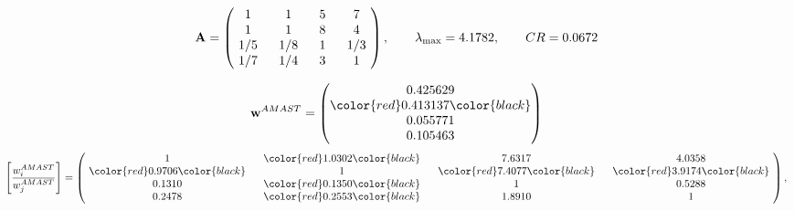 \begin{example}
\begin{equation*}
\mathbf{A} =
\begin{pmatrix}
$\,\,$ 1 $\,\,$ & $\,\,$1$\,\,$ & $\,\,$5$\,\,$ & $\,\,$7 $\,\,$ \\
$\,\,$ 1 $\,\,$ & $\,\,$ 1 $\,\,$ & $\,\,$8$\,\,$ & $\,\,$4 $\,\,$ \\
$\,\,$ 1/5$\,\,$ & $\,\,$ 1/8$\,\,$ & $\,\,$ 1 $\,\,$ & $\,\,$ 1/3 $\,\,$ \\
$\,\,$ 1/7$\,\,$ & $\,\,$ 1/4$\,\,$ & $\,\,$3$\,\,$ & $\,\,$ 1  $\,\,$ \\
\end{pmatrix},
\qquad
\lambda_{\max} =
4.1782,
\qquad
CR = 0.0672
\end{equation*}

\begin{equation*}
\mathbf{w}^{AMAST} =
\begin{pmatrix}
0.425629\\
\color{red} 0.413137\color{black} \\
0.055771\\
0.105463
\end{pmatrix}\end{equation*}
\begin{equation*}
\left[ \frac{{w}^{AMAST}_i}{{w}^{AMAST}_j} \right] =
\begin{pmatrix}
$\,\,$ 1 $\,\,$ & $\,\,$\color{red} 1.0302\color{black} $\,\,$ & $\,\,$7.6317$\,\,$ & $\,\,$4.0358$\,\,$ \\
$\,\,$\color{red} 0.9706\color{black} $\,\,$ & $\,\,$ 1 $\,\,$ & $\,\,$\color{red} 7.4077\color{black} $\,\,$ & $\,\,$\color{red} 3.9174\color{black}   $\,\,$ \\
$\,\,$0.1310$\,\,$ & $\,\,$\color{red} 0.1350\color{black} $\,\,$ & $\,\,$ 1 $\,\,$ & $\,\,$0.5288 $\,\,$ \\
$\,\,$0.2478$\,\,$ & $\,\,$\color{red} 0.2553\color{black} $\,\,$ & $\,\,$1.8910$\,\,$ & $\,\,$ 1  $\,\,$ \\
\end{pmatrix},
\end{equation*}


\end{example}
